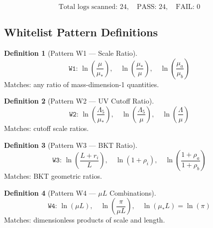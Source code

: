 \documentclass[11pt,a4paper]{article}
\theoremstyle{definition}
\newtheorem{definition}{Definition}[section]
\begin{document}
\begin{equation}
\label{eq:log_scan_result}
\text{Total logs scanned: } 24, \quad \text{PASS: } 24, \quad \text{FAIL: } 0
\end{equation}

\subsection{Whitelist Pattern Definitions}
\label{subsec:whitelist_def}

\begin{definition}[Pattern W1 — Scale Ratio]
\label{def:w1}
\begin{equation}
\label{eq:w1_regex}
\texttt{W1: } \ln\left(\frac{\mu}{\mu_*}\right), \quad \ln\left(\frac{\mu_*}{\mu}\right), \quad \ln\left(\frac{\mu_a}{\mu_b}\right)
\end{equation}
Matches: any ratio of mass-dimension-1 quantities.
\end{definition}

\begin{definition}[Pattern W2 — UV Cutoff Ratio]
\label{def:w2}
\begin{equation}
\label{eq:w2_regex}
\texttt{W2: } \ln\left(\frac{\Lambda_5}{\mu_*}\right), \quad \ln\left(\frac{\Lambda_5}{\mu}\right), \quad \ln\left(\frac{\Lambda}{\mu}\right)
\end{equation}
Matches: cutoff scale ratios.
\end{definition}

\begin{definition}[Pattern W3 — BKT Ratio]
\label{def:w3}
\begin{equation}
\label{eq:w3_regex}
\texttt{W3: } \ln\left(\frac{L + r_i}{L}\right), \quad \ln(1 + \rho_i), \quad \ln\left(\frac{1 + \rho_a}{1 + \rho_b}\right)
\end{equation}
Matches: BKT geometric ratios.
\end{definition}

\begin{definition}[Pattern W4 — $\mu L$ Combinations]
\label{def:w4}
\begin{equation}
\label{eq:w4_regex}
\texttt{W4: } \ln(\mu L), \quad \ln\left(\frac{\pi}{\mu L}\right), \quad \ln(\mu_* L) = \ln(\pi)
\end{equation}
Matches: dimensionless products of scale and length.
\end{definition}
\end{document}
